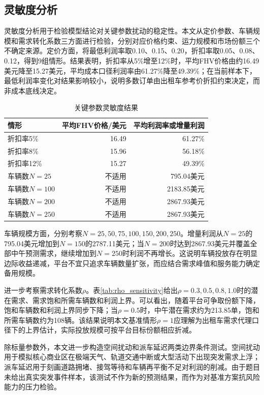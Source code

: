 \documentclass[UTF8,a4paper,12pt]{ctexart}
\begin{document}
\subsection{灵敏度分析}
灵敏度分析用于检验模型结论对关键参数扰动的稳定性。本文从定价参数、车辆规模和需求转化系数三方面进行检验，分别对应价格约束、运力规模和市场份额三个不确定来源。定价方面，将最低利润率取0.10、0.15、0.20，折扣率取0.05、0.08、0.12，得到9组情形。结果表明，折扣率从5\%增至12\%时，平均FHV价格由约16.49美元降至15.27美元，平均成本口径利润率由61.27\%降至49.39\%；在当前样本下，最低利润率变化对结果影响较小，说明多数订单由出租车参考价折扣约束决定，而非成本底线决定。

\begin{table}[H]
\centering
\caption{关键参数灵敏度结果}
\label{tab:sensitivity}
\begin{tabular}{lrr}
\toprule
情形 & 平均FHV价格/美元 & 平均利润率或增量利润 \\
\midrule
折扣率5\% & 16.49 & 61.27\% \\
折扣率8\% & 15.96 & 56.18\% \\
折扣率12\% & 15.27 & 49.39\% \\
车辆数$N=25$ & 不适用 & 795.04美元 \\
车辆数$N=100$ & 不适用 & 2183.85美元 \\
车辆数$N=200$ & 不适用 & 2867.93美元 \\
车辆数$N=250$ & 不适用 & 2867.93美元 \\
\bottomrule
\end{tabular}
\end{table}

车辆规模方面，分别考察$N=25,50,75,100,150,200,250$。增量利润从$N=25$的795.04美元增加到$N=150$的2787.11美元；当$N=200$时达到2867.93美元并覆盖全部中午预测需求，继续增加到$N=250$时利润不再增长。这说明车辆投放存在明显边际收益递减，平台不宜只追求车辆数量扩张，而应结合需求峰值和服务能力确定备用规模。

进一步考察需求转化系数$\rho$。表\ref{tab:rho_sensitivity}给出$\rho=0.3,0.5,0.8,1.0$时的潜在需求、需求饱和所需车辆数和利润上界。可以看出，随着平台可争取份额下降，饱和车辆数和利润上界同步下降；当$\rho=0.5$时，中午潜在需求约为213.85单，饱和所需车辆数约为108辆。该结果说明本文基准情形$\rho=1$应理解为出租车需求代理口径下的上界估计，实际投放规模可按平台目标份额相应折减。

除标量参数外，本文进一步构造空间扰动和派车延迟两类边界条件测试。空间扰动用于模拟核心商业区在极端天气、轨道交通中断或大型活动下出现突发需求上浮；派车延迟用于刻画道路拥堵、接驾等待和车辆再平衡不足对利润的削减。由于题目未给出真实突发事件样本，该测试不作为新的预测结果，而作为对基准方案抗风险能力的压力检验。
\end{document}
